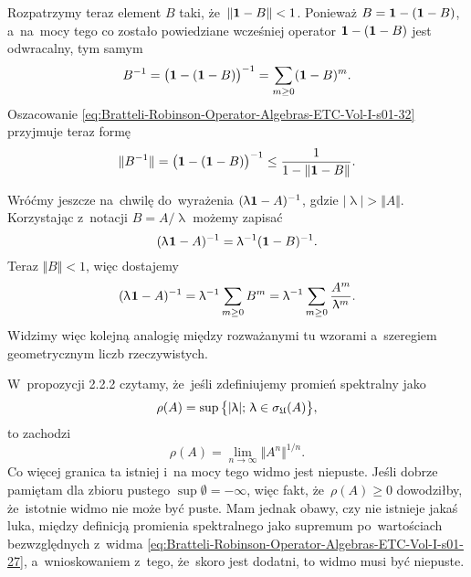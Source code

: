 \documentclass[a4paper,11pt]{article}
\numberwithin{equation}{section}
\renewcommand{\lambda}{\uplambda}
\begin{document}
Rozpatrzymy teraz element $B$ taki, że~$\Vert \mathbf{1} - B \Vert < 1$. Ponieważ
$B = \mathbf{1} - ( \mathbf{1} - B )$, a~na~mocy tego co zostało
powiedziane wcześniej operator $\mathbf{1} - ( \mathbf{1} - B )$ jest
odwracalny, tym samym
\begin{equation}
  \label{eq:Bratteli-Robinson-Operator-Algebras-ETC-Vol-I-s01-33}
  B^{ -1 } =
  \big( \mathbf{1} - ( \mathbf{1} - B ) \big)^{ -1 } =
  \sum_{ m \geq 0 } ( \mathbf{1} - B )^{ m }.
\end{equation}
Oszacowanie \eqref{eq:Bratteli-Robinson-Operator-Algebras-ETC-Vol-I-s01-32}
przyjmuje teraz formę
\begin{equation}
  \label{eq:Bratteli-Robinson-Operator-Algebras-ETC-Vol-I-s01-34}
  \Vert B^{ -1 } \Vert =
  \big( \mathbf{1} - ( \mathbf{1} - B ) \big)^{ -1 } \leq
  \frac{ 1 }{ 1 - \Vert \mathbf{1} - B \Vert }.
\end{equation}

Wróćmy jeszcze na~chwilę do~wyrażenia $( \lambda \UnitAlg - A )^{ -1 }$, gdzie
$| \lambda | > \Vert A \Vert$. Korzystając z~notacji $B = A / \lambda$ możemy zapisać
\begin{equation}
  \label{eq:Bratteli-Robinson-Operator-Algebras-ETC-Vol-I-s01-35}
  ( \lambda \HorSpaceOne \UnitAlg - A )^{ -1 } =
  \lambda^{ -1 } ( \UnitAlg - B )^{ -1 }.
\end{equation}
Teraz $\Vert B \Vert < 1$, więc dostajemy
\begin{equation}
  \label{eq:Bratteli-Robinson-Operator-Algebras-ETC-Vol-I-s01-36}
  ( \lambda \HorSpaceOne \UnitAlg - A )^{ -1 } =
  \lambda^{ -1 } \sum_{ m \geq 0 } B^{ m } =
  \lambda^{ -1 } \sum_{ m \geq 0 } \frac{ A^{ m } }{ \lambda^{ m } }.
\end{equation}
Widzimy więc kolejną analogię między rozważanymi tu wzorami a~szeregiem
geometrycznym liczb rzeczywistych.

\VerSpaceFour





\noindent
{} W~propozycji 2.2.2 czytamy, że~jeśli zdefiniujemy promień spektralny
jako
\begin{equation}
  \label{eq:Bratteli-Robinson-Operator-Algebras-ETC-Vol-I-s01-37}
  \rho( A ) =
  \sup\big\{ | \lambda |; \, \lambda \in \sigma_{ \Ufrak }( A ) \big\},
\end{equation}
to zachodzi
\begin{equation}
  \label{eq:Bratteli-Robinson-Operator-Algebras-ETC-Vol-I-s01-38}
  \rho( A ) =
  \lim_{ n \to \infty } \Vert A^{ n } \Vert^{ 1 / n }.
\end{equation}
Co więcej granica ta istniej i~na mocy tego widmo jest niepuste. Jeśli
dobrze pamiętam dla zbioru pustego $\sup \emptyset = -\infty$, więc fakt,
że~$\rho( A ) \geq 0$ dowodziłby, że~istotnie widmo nie może być puste. Mam jednak
obawy, czy nie istnieje jakaś luka, między definicją promienia spektralnego
jako supremum po~wartościach bezwzględnych z~widma
\eqref{eq:Bratteli-Robinson-Operator-Algebras-ETC-Vol-I-s01-27},
a~wnioskowaniem z~tego, że~skoro jest dodatni, to widmo musi być niepuste.
\end{document}
